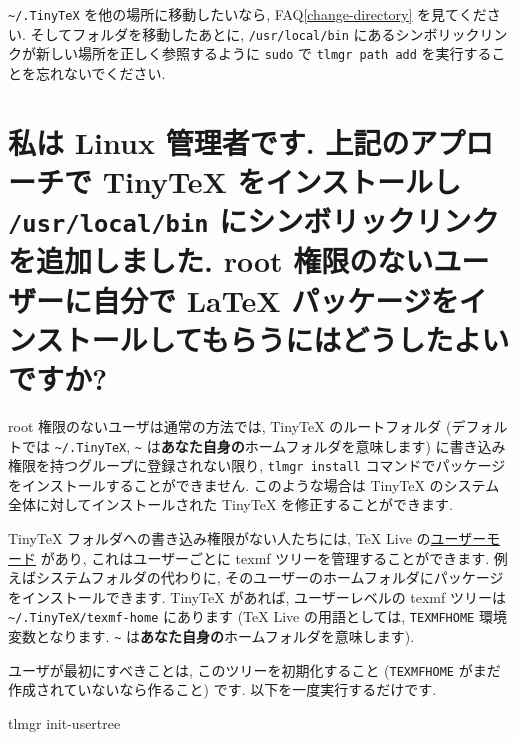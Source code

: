 \documentclass[
  xelatex,ja=standard,jafont=noto]{bxjsreport}
\newenvironment{Shaded}{\begin{snugshade}}{\end{snugshade}}
\newcommand{\ExtensionTok}[1]{#1}
\newcommand{\NormalTok}[1]{#1}
\begin{document}
\texttt{\textasciitilde{}/.TinyTeX} を他の場所に移動したいなら,
FAQ\ref{change-directory} を見てください.
そしてフォルダを移動したあとに, \texttt{/usr/local/bin}
にあるシンボリックリンクが新しい場所を正しく参照するように \texttt{sudo}
で \texttt{tlmgr\ path\ add} を実行することを忘れないでください.

\hypertarget{non-root-package-installation}{%
\section{\texorpdfstring{私は Linux 管理者です. 上記のアプローチで
TinyTeX をインストールし \texttt{/usr/local/bin}
にシンボリックリンクを追加しました. root 権限のないユーザーに自分で
LaTeX
パッケージをインストールしてもらうにはどうしたよいですか?}{私は Linux 管理者です. 上記のアプローチで TinyTeX をインストールし /usr/local/bin にシンボリックリンクを追加しました. root 権限のないユーザーに自分で LaTeX パッケージをインストールしてもらうにはどうしたよいですか?}}\label{non-root-package-installation}}

root 権限のないユーザは通常の方法では, TinyTeX のルートフォルダ
(デフォルトでは \texttt{\textasciitilde{}/.TinyTeX},
\texttt{\textasciitilde{}}
は\textbf{あなた自身の}ホームフォルダを意味します)
に書き込み権限を持つグループに登録されない限り, \texttt{tlmgr\ install}
コマンドでパッケージをインストールすることができません. このような場合は
TinyTeX のシステム全体に対してインストールされた TinyTeX
を修正することができます.

TinyTeX フォルダへの書き込み権限がない人たちには, TeX Live
の\href{https://www.tug.org/texlive/doc/tlmgr.html\#USER-MODE}{ユーザーモード}
があり, これはユーザーごとに texmf ツリーを管理することができます.
例えばシステムフォルダの代わりに,
そのユーザーのホームフォルダにパッケージをインストールできます. TinyTeX
があれば, ユーザーレベルの texmf ツリーは
\texttt{\textasciitilde{}/.TinyTeX/texmf-home} にあります (TeX Live
の用語としては, \texttt{TEXMFHOME} 環境変数となります.
\texttt{\textasciitilde{}}
は\textbf{あなた自身の}ホームフォルダを意味します).

ユーザが最初にすべきことは, このツリーを初期化すること
(\texttt{TEXMFHOME} がまだ作成されていないなら作ること) です.
以下を一度実行するだけです.

\begin{Shaded}
\begin{Highlighting}[]
\ExtensionTok{tlmgr}\NormalTok{ init{-}usertree}
\end{Highlighting}
\end{Shaded}
\end{document}
